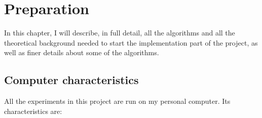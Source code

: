 \documentclass[12pt,twoside,notitlepage]{report}
\begin{document}








\cleardoublepage



\chapter{Preparation}

In this chapter, I will describe, in full detail, all the algorithms and all the theoretical background needed to start the implementation part of the project, as well as finer details about some of the algorithms.

\section{Computer characteristics}

All the experiments in this project are run on my personal computer. Its characteristics are:
\end{document}

